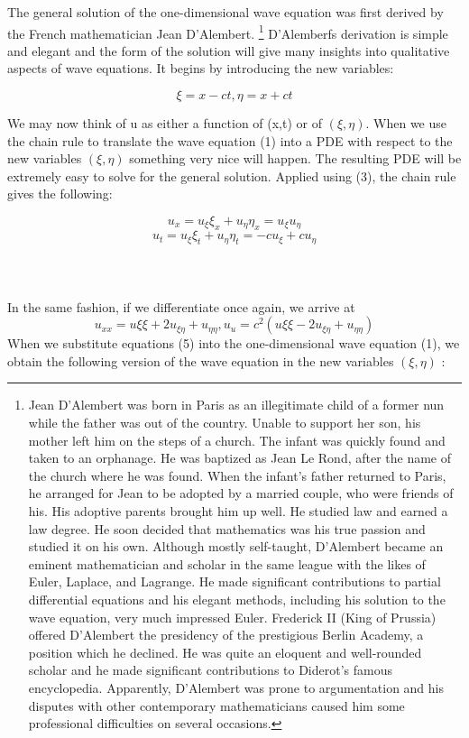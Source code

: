 \documentclass[../main.tex]{subfiles}
\begin{document}
The general solution of the one-dimensional wave
equation was first derived by the French
mathematician Jean D'Alembert. 
\footnote 
{Jean D'Alembert was born in Paris as an illegitimate child of a former nun while the father was out of
the country. Unable to support her son, his mother left him on the steps of a church. The infant was
quickly found and taken to an orphanage. He was baptized as Jean Le Rond, after the name of the
church where he was found. When the infant's father returned to Paris, he arranged for Jean to be
adopted by a married couple, who were friends of his. His adoptive parents brought him up well. He
studied law and earned a law degree. He soon decided that mathematics was his true passion and
studied it on his own. Although mostly self-taught, D'Alembert became an eminent mathematician and
scholar in the same league with the likes of Euler, Laplace, and Lagrange. He made significant
contributions to partial differential equations and his elegant methods, including his solution to the
wave equation, very much impressed Euler. Frederick II (King of Prussia) offered D'Alembert the
presidency of the prestigious Berlin Academy, a position which he declined. He was quite an eloquent
and well-rounded scholar and he made significant contributions to Diderot's famous encyclopedia.
Apparently, D'Alembert was prone to argumentation and his disputes with other contemporary
mathematicians caused him some professional difficulties on several occasions.}
 D'Alemberfs
derivation is simple and elegant and the form of
the solution will give many insights into qualitative
aspects of wave equations. It begins by
introducing the new variables: 

\begin{equation}
\xi=x-ct, \eta=x+ct 
\label{eq:eps}
\end{equation}

We may now think of u as either a function of (x,t)
or of $(\xi,\eta )$. When we use the chain rule to
translate the wave equation (1) into a PDE with
respect to the new variables $(\xi,\eta )$ something
very nice will happen. The resulting PDE will be
extremely easy to solve for the general solution. Applied using (3), the chain rule
gives the following: 

$$u_x = u_\xi \xi_x + u_\eta \eta_x = u_\xi u_\eta$$
\begin{equation}
u_t =u_\xi \xi_t +u_\eta \eta_t =-cu_\xi+cu_\eta
\label{eq:eps}
\end{equation}
\\
\\
\\
In the same fashion, if we differentiate once again, we arrive at
\begin{equation}
u_{xx} =u{\xi \xi}+2u_{\xi \eta}+u_{\eta \eta} , u_u = c^2(u{\xi \xi}-2u_{\xi \eta}+ u_{\eta \eta})  
\label{eq:eps}
\end{equation}
When we substitute equations (5) into the one-dimensional wave equation (1), we
obtain the following version of the wave equation in the new variables $(\xi ,\eta)$ : 
\end{document}
